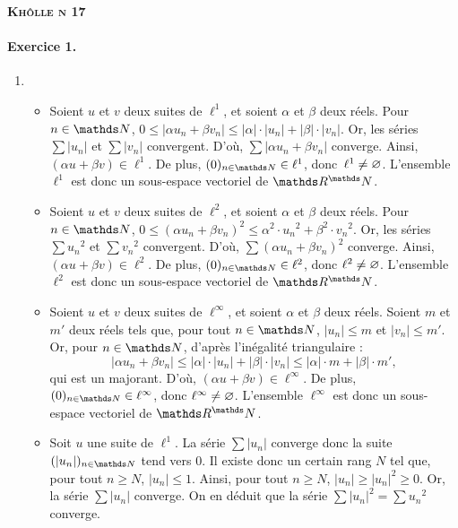 \documentclass[a4paper]{article}
\def\khollenum{17}
\begin{document}
	\begin{center}
		\bfseries\scshape\Huge Khôlle n \khollenum
	\end{center}

	\paragraph{Exercice 1.}
	\begin{enumerate}
		\item
			\begin{itemize}
				\item Soient $u$ et $v$ deux suites de $\ell^1$, et soient $\alpha$ et $\beta$ deux réels.
					Pour $n \in \N$, $0 \le |\alpha u_n + \beta v_n| \le |\alpha| \cdot |u_n| + |\beta| \cdot |v_n|$.
					Or, les séries $\sum |u_n|$ et $\sum|v_n|$ convergent. D'où, $\sum |\alpha u_n + \beta v_n|$ converge.
					Ainsi, $(\alpha u + \beta v) \in \ell^1$.
					De plus, $(0)_{n\in\N} \in \ell^1$, donc~$\ell^1 \neq \varnothing$.
					L'ensemble $\ell^1$ est donc un sous-espace vectoriel de $\R^\N$.
				\item Soient $u$ et $v$ deux suites de $\ell^2$, et soient $\alpha$ et $\beta$ deux réels.
					Pour $n \in \N$, $0 \le (\alpha u_n + \beta v_n)^2 \le \alpha^2 \cdot u_n{}^2 + \beta^2 \cdot v_n{}^2$.
					Or, les séries $\sum u_n{}^2$ et $\sum v_n{}^2$ convergent. D'où, $\sum(\alpha u_n + \beta v_n)^2$ converge.
					Ainsi, $(\alpha u + \beta v) \in \ell^2$.
					De plus, $(0)_{n\in\N} \in \ell^2$, donc $\ell^2 \neq \varnothing$.
					L'ensemble $\ell^2$ est donc un sous-espace vectoriel de $\R^\N$.
				\item Soient $u$ et $v$ deux suites de $\ell^\infty$, et soient $\alpha$ et $\beta$ deux réels.
					Soient $m$ et $m'$ deux réels tels que, pour tout $n \in \N$, $|u_n| \le m$ et $|v_n| \le m'$.
					Or, pour $n \in \N$, d'après l'inégalité triangulaire : \[
						|\alpha u_n + \beta v_n| \le |\alpha| \cdot |u_n| + |\beta| \cdot |v_n| \le |\alpha| \cdot m + |\beta| \cdot m'
					,\] qui est un majorant.
					D'où, $(\alpha u + \beta v) \in \ell^\infty$.
					De plus, $(0)_{n\in\N} \in \ell^\infty$, donc $\ell^\infty \neq \varnothing$.
					L'ensemble $\ell^\infty$ est donc un sous-espace vectoriel de $\R^\N$.
				\item Soit $u$ une suite de $\ell^1$. La série $\sum |u_n|$ converge donc la suite $(|u_n|)_{n \in \N}$ tend vers 0. Il existe donc un certain rang $N$ tel que, pour tout $n \ge N$, $|u_n| \le 1$.
					Ainsi, pour tout $n \ge N$, $|u_n| \ge |u_n|^2 \ge 0$.
					Or, la série $\sum |u_n|$ converge. On en déduit que la série $\sum |u_n|^2 = \sum u_n{}^2$ converge.

\end{itemize}
\end{enumerate}
\end{document}
